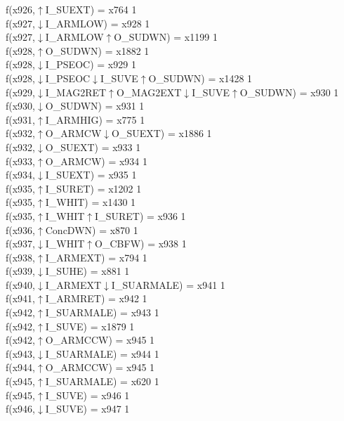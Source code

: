 f(x926,$\uparrow$I\_SUEXT) = x764 {1} \\
f(x927,$\downarrow$I\_ARMLOW) = x928 {1} \\
f(x927,$\downarrow$I\_ARMLOW$\uparrow$O\_SUDWN) = x1199 {1} \\
f(x928,$\uparrow$O\_SUDWN) = x1882 {1} \\
f(x928,$\downarrow$I\_PSEOC) = x929 {1} \\
f(x928,$\downarrow$I\_PSEOC$\downarrow$I\_SUVE$\uparrow$O\_SUDWN) = x1428 {1} \\
f(x929,$\downarrow$I\_MAG2RET$\uparrow$O\_MAG2EXT$\downarrow$I\_SUVE$\uparrow$O\_SUDWN) = x930 {1} \\
f(x930,$\downarrow$O\_SUDWN) = x931 {1} \\
f(x931,$\uparrow$I\_ARMHIG) = x775 {1} \\
f(x932,$\uparrow$O\_ARMCW$\downarrow$O\_SUEXT) = x1886 {1} \\
f(x932,$\downarrow$O\_SUEXT) = x933 {1} \\
f(x933,$\uparrow$O\_ARMCW) = x934 {1} \\
f(x934,$\downarrow$I\_SUEXT) = x935 {1} \\
f(x935,$\uparrow$I\_SURET) = x1202 {1} \\
f(x935,$\uparrow$I\_WHIT) = x1430 {1} \\
f(x935,$\uparrow$I\_WHIT$\uparrow$I\_SURET) = x936 {1} \\
f(x936,$\uparrow$ConcDWN) = x870 {1} \\
f(x937,$\downarrow$I\_WHIT$\uparrow$O\_CBFW) = x938 {1} \\
f(x938,$\uparrow$I\_ARMEXT) = x794 {1} \\
f(x939,$\downarrow$I\_SUHE) = x881 {1} \\
f(x940,$\downarrow$I\_ARMEXT$\downarrow$I\_SUARMALE) = x941 {1} \\
f(x941,$\uparrow$I\_ARMRET) = x942 {1} \\
f(x942,$\uparrow$I\_SUARMALE) = x943 {1} \\
f(x942,$\uparrow$I\_SUVE) = x1879 {1} \\
f(x942,$\uparrow$O\_ARMCCW) = x945 {1} \\
f(x943,$\downarrow$I\_SUARMALE) = x944 {1} \\
f(x944,$\uparrow$O\_ARMCCW) = x945 {1} \\
f(x945,$\uparrow$I\_SUARMALE) = x620 {1} \\
f(x945,$\uparrow$I\_SUVE) = x946 {1} \\
f(x946,$\downarrow$I\_SUVE) = x947 {1} \\
